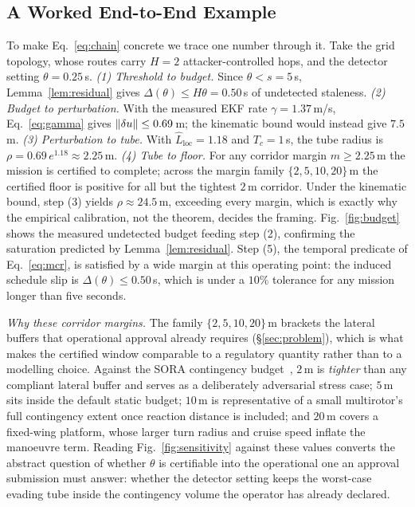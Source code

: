 \subsection{A Worked End-to-End Example}
\label{sec:worked}
To make Eq.~\eqref{eq:chain} concrete we trace one number through it. Take the grid
topology, whose routes carry $H=2$ attacker-controlled hops, and the detector
setting $\theta=0.25$\,s. \emph{(1) Threshold to budget.} Since
$\theta<s=5$\,s, Lemma~\ref{lem:residual} gives $\Delta(\theta)\le H\theta=0.50$\,s
of undetected staleness. \emph{(2) Budget to perturbation.} With the measured
EKF rate $\gamma=1.37$\,m/s, Eq.~\eqref{eq:gamma} gives
$\left\lVert \delta u\right\rVert\le0.69$\,m; the kinematic bound would instead give $7.5$\,m.
\emph{(3) Perturbation to tube.} With $\hat L_{\mathrm{loc}}=1.18$ and
$T_c=1$\,s, the tube radius is $\rho=0.69\,e^{1.18}\approx2.25$\,m. \emph{(4) Tube to
floor.} For any corridor margin $m\ge2.25$\,m the mission is certified to
complete; across the margin family $\{2,5,10,20\}$\,m the certified floor is
positive for all but the tightest $2$\,m corridor. Under the kinematic bound,
step (3) yields $\rho\approx24.5$\,m, exceeding every margin, which is exactly
why the empirical calibration, not the theorem, decides the framing.
Fig.~\ref{fig:budget} shows the measured undetected budget feeding step (2),
confirming the saturation predicted by Lemma~\ref{lem:residual}. Step (5), the
temporal predicate of Eq.~\eqref{eq:mcr}, is satisfied by a wide margin at this
operating point: the induced schedule slip is $\Delta(\theta)\le0.50$\,s, which
is under a $10\%$ tolerance for any mission longer than five seconds.

\emph{Why these corridor margins.} The family $\{2,5,10,20\}$\,m brackets the
lateral buffers that operational approval already requires
(\S\ref{sec:problem}), which is what makes the certified window comparable to a
regulatory quantity rather than to a modelling choice. Against the SORA
contingency budget~\cite{jarus_sora25,easa_uspace2021}, $2$\,m is \emph{tighter}
than any compliant lateral buffer and serves as a deliberately adversarial
stress case; $5$\,m sits inside the default static budget; $10$\,m is
representative of a small multirotor's full contingency extent once reaction
distance is included; and $20$\,m covers a fixed-wing platform, whose larger turn
radius and cruise speed inflate the manoeuvre term. Reading
Fig.~\ref{fig:sensitivity} against these values converts the abstract question
of whether $\theta$ is certifiable into the operational one an approval
submission must answer: whether the detector setting keeps the worst-case
evading tube inside the contingency volume the operator has already declared.

